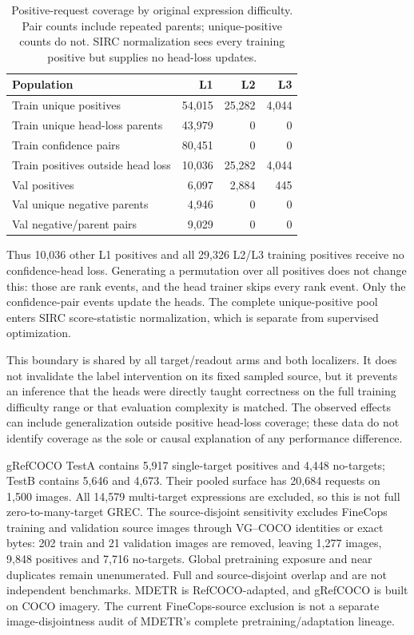 \documentclass[10pt,twocolumn,letterpaper]{article}
\begin{document}
\begin{table}[t]
\centering\small
\setlength{\tabcolsep}{3pt}
\caption{Positive-request coverage by original expression difficulty.
Pair counts include repeated parents; unique-positive counts do not.
SIRC normalization sees every training positive but supplies no head-loss
updates.}
\label{tab:v6_positive_coverage}
\begin{tabular}{@{}p{}rrr@{}}\toprule
Population & L1 & L2 & L3\\\midrule
Train unique positives & 54,015 & 25,282 & 4,044\\
Train unique head-loss parents & 43,979 & 0 & 0\\
Train confidence pairs & 80,451 & 0 & 0\\
Train positives outside head loss & 10,036 & 25,282 & 4,044\\
Val positives & 6,097 & 2,884 & 445\\
Val unique negative parents & 4,946 & 0 & 0\\
Val negative/parent pairs & 9,029 & 0 & 0\\\bottomrule
\end{tabular}
\end{table}

Thus 10,036 other L1 positives and all 29,326 L2/L3 training positives
receive no confidence-head loss. Generating a permutation over all
positives does not change this: those are rank events, and the head
trainer skips every rank event. Only the confidence-pair events update
the heads. The complete unique-positive pool enters SIRC score-statistic
normalization, which is separate from supervised optimization.

This boundary is shared by all target/readout arms and both localizers.
It does not invalidate the label intervention on its fixed sampled
source, but it prevents an inference that the heads were directly taught
correctness on the full training difficulty range or that evaluation
complexity is matched. The observed effects can include generalization
outside positive head-loss coverage; these data do not identify coverage
as the sole or causal explanation of any performance difference.

gRefCOCO TestA contains 5,917 single-target positives and 4,448 no-targets;
TestB contains 5,646 and 4,673. Their pooled surface has 20,684 requests
on 1,500 images. All 14,579 multi-target expressions are excluded,
so this is not full zero-to-many-target GREC.
The source-disjoint sensitivity excludes FineCops training and validation
source images through VG--COCO identities or exact bytes: 202 train
and 21 validation images are removed, leaving 1,277 images,
9,848 positives and 7,716 no-targets.
Global pretraining exposure and near duplicates remain unenumerated.
Full and source-disjoint overlap and are not independent benchmarks.
MDETR is RefCOCO-adapted, and gRefCOCO is built on COCO imagery.
The current FineCops-source exclusion is not a separate image-disjointness
audit of MDETR's complete pretraining/adaptation lineage.
\end{document}
